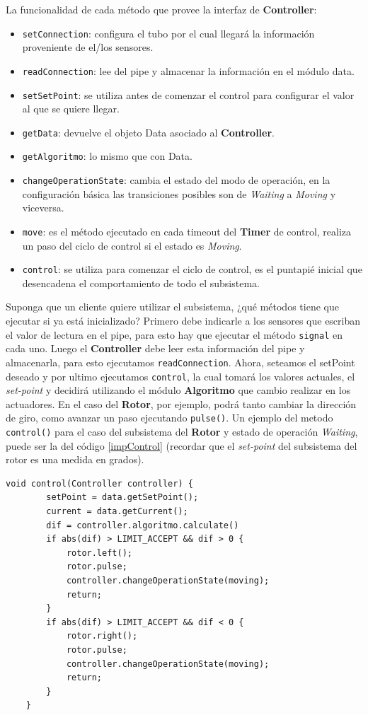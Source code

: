 La funcionalidad de cada método que provee la interfaz de \textbf{Controller}:
\begin{itemize}
    \item \verb|setConnection|: configura el tubo por el cual llegará la información proveniente de el/los sensores.
    \item \verb|readConnection|: lee del pipe y almacenar la información en el módulo data.
    \item \verb|setSetPoint|: se utiliza antes de comenzar el control para configurar el valor al que se quiere llegar.
    \item \verb|getData|: devuelve el objeto Data asociado al \textbf{Controller}.
    \item \verb|getAlgoritmo|: lo mismo que con Data.
    \item \verb|changeOperationState|: cambia el estado del modo de operación, en la configuración básica las transiciones posibles son de \textit{Waiting} a \textit{Moving} y viceversa.
    \item \verb|move|: es el método ejecutado en cada timeout del \textbf{Timer} de control, realiza un paso del ciclo de control si el estado es \textit{Moving}.
    \item \verb|control|: se utiliza para comenzar el ciclo de control, es el puntapié inicial que desencadena el comportamiento de todo el subsistema.
\end{itemize}

Suponga que un cliente quiere utilizar el subsistema, ¿qué métodos tiene que ejecutar si ya está inicializado? Primero debe indicarle a los sensores que escriban el valor de lectura en el pipe, para esto hay que ejecutar el método \verb|signal| en cada uno. Luego el \textbf{Controller} debe leer esta información del pipe y almacenarla, para esto ejecutamos \verb|readConnection|. Ahora, seteamos el setPoint deseado y por ultimo ejecutamos \verb|control|, la cual tomará los valores actuales, el \textit{set-point} y decidirá utilizando el módulo \textbf{Algoritmo} que cambio realizar en los actuadores. En el caso del \textbf{Rotor}, por ejemplo, podrá tanto cambiar la dirección de giro, como avanzar un paso ejecutando \verb|pulse()|. Un ejemplo del metodo \verb|control()| para el caso del subsistema del \textbf{Rotor} y estado de operación \textit{Waiting}, puede ser la del código \ref{impControl} (recordar que el \textit{set-point} del subsistema del rotor es una medida en grados).

\begin{lstlisting}[caption=Ejemplo de implementación del método control del módulo Controller.,label={impControl}]
    void control(Controller controller) {
        setPoint = data.getSetPoint();
        current = data.getCurrent();
        dif = controller.algoritmo.calculate()
        if abs(dif) > LIMIT_ACCEPT && dif > 0 {
            rotor.left();
            rotor.pulse;
            controller.changeOperationState(moving);
            return;
        }
        if abs(dif) > LIMIT_ACCEPT && dif < 0 {
            rotor.right();
            rotor.pulse;
            controller.changeOperationState(moving);
            return;
        }
    }
\end{lstlisting}

